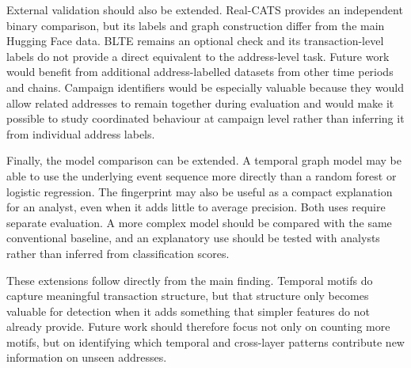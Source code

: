 \documentclass{thesisclass}
\begin{document}
External validation should also be extended. Real-CATS provides an independent
binary comparison, but its labels and graph construction differ from the main
Hugging Face data. BLTE remains an optional check and its transaction-level
labels do not provide a direct equivalent to the address-level task. Future
work would benefit from additional address-labelled datasets from other time
periods and chains. Campaign identifiers would be especially valuable because
they would allow related addresses to remain together during evaluation and
would make it possible to study coordinated behaviour at campaign level rather
than inferring it from individual address labels.

Finally, the model comparison can be extended. A temporal graph model may be
able to use the underlying event sequence more directly than a random forest or
logistic regression. The fingerprint may also be useful as a compact
explanation for an analyst, even when it adds little to average precision. Both
uses require separate evaluation. A more complex model should be compared with
the same conventional baseline, and an explanatory use should be tested with
analysts rather than inferred from classification scores.

These extensions follow directly from the main finding. Temporal motifs do
capture meaningful transaction structure, but that structure only becomes
valuable for detection when it adds something that simpler features do not
already provide. Future work should therefore focus not only on counting more
motifs, but on identifying which temporal and cross-layer patterns contribute
new information on unseen addresses.




 




\clearpage
{}
{}




												  


\end{document}
